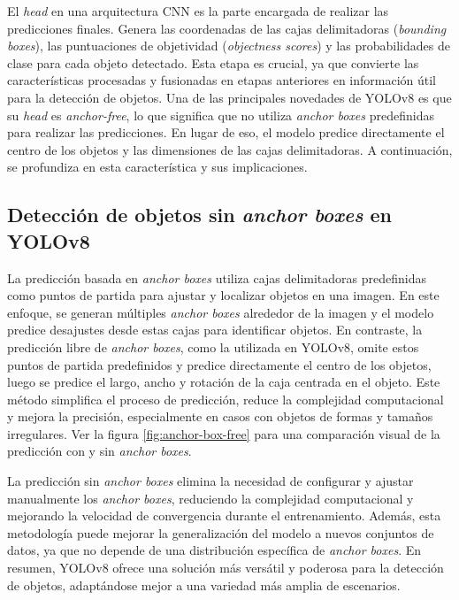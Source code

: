 El \textit{head} en una arquitectura CNN es la parte encargada de realizar las predicciones finales. Genera las coordenadas de las cajas delimitadoras (\textit{bounding boxes}), las puntuaciones de objetividad (\textit{objectness scores}) y las probabilidades de clase para cada objeto detectado. Esta etapa es crucial, ya que convierte las características procesadas y fusionadas en etapas anteriores en información útil para la detección de objetos. Una de las principales novedades de YOLOv8 es que su \textit{head} es \textit{anchor-free}, lo que significa que no utiliza \textit{anchor boxes} predefinidas para realizar las predicciones. En lugar de eso, el modelo predice directamente el centro de los objetos y las dimensiones de las cajas delimitadoras. A continuación, se profundiza en esta característica y sus implicaciones.


\subsection{Detección de objetos sin \textit{anchor boxes} en YOLOv8}
La predicción basada en \textit{anchor boxes} utiliza cajas delimitadoras predefinidas como puntos de partida para ajustar y localizar objetos en una imagen. En este enfoque, se generan múltiples \textit{anchor boxes} alrededor de la imagen y el modelo predice desajustes desde estas cajas para identificar objetos. En contraste, la predicción libre de \textit{anchor boxes}, como la utilizada en YOLOv8, omite estos puntos de partida predefinidos y predice directamente el centro de los objetos, luego se predice el largo, ancho y rotación de la caja centrada en el objeto. Este método simplifica el proceso de predicción, reduce la complejidad computacional y mejora la precisión, especialmente en casos con objetos de formas y tamaños irregulares. Ver la figura \ref{fig:anchor-box-free} para una comparación visual de la predicción con y sin \textit{anchor boxes}.

La predicción sin \textit{anchor boxes} elimina la necesidad de configurar y ajustar manualmente los \textit{anchor boxes}, reduciendo la complejidad computacional y mejorando la velocidad de convergencia durante el entrenamiento. Además, esta metodología puede mejorar la generalización del modelo a nuevos conjuntos de datos, ya que no depende de una distribución específica de \textit{anchor boxes}. En resumen, YOLOv8 ofrece una solución más versátil y poderosa para la detección de objetos, adaptándose mejor a una variedad más amplia de escenarios.

